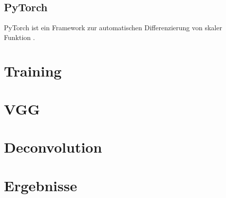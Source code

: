 \subsection{PyTorch}
PyTorch ist ein Framework zur automatischen Differenzierung von skaler Funktion \autocite{PaszkeAutomaticdifferentiationPyTorch2017}.

\section{Training}

\section{\textcite{XuPageSegmentationHistorical2017}}
\section{VGG}
\section{Deconvolution}
\section{Ergebnisse}